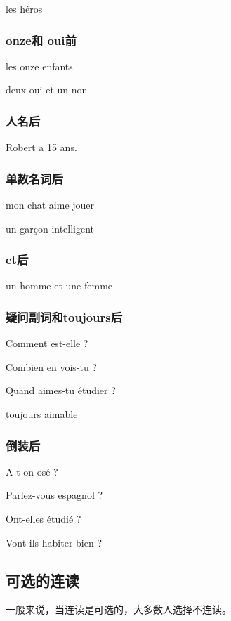 les héros \textipa{[lE e ro]}


\subsubsection{onze和 oui前}

les onze enfants \textipa{[lE O z\~a f\~a]}

deux oui et un non \textipa{[d\o wi e \~a n\~O]}

\subsubsection{人名后}

Robert a 15 ans. \textipa{[rO bEr a k\~E z\~a]}

\subsubsection{单数名词后}

mon chat aime jouer \textipa{[m\~O Sa Em jue]}

un garçon intelligent \textipa{[\~a gar s\~O \~E tE li Z\~a]}


\subsubsection{et后}

un homme et une femme 

\subsubsection{疑问副词和toujours后}

Comment est-elle ?	\textipa{[kO m\~a e  tEl]}

Combien en vois-tu ?	\textipa{[k\~O bj\~E \~a vwa ty]}

Quand aimes-tu étudier ? \textipa{[k\~a Em ty e ty dje]}

toujours aimable  \textipa{[tu Zu rE mabl]}

\subsubsection{倒装后}

A-t-on osé ?	\textipa{[a t\~O o ze]}

Parlez-vous espagnol ?	

Ont-elles étudié ?	\textipa{[\~O tE le ty die]}

Vont-ils habiter bien ?	\textipa{[v\~O ti la bi te bj\~E]}

\subsection{可选的连读}

一般来说，当连读是可选的，大多数人选择不连读。





